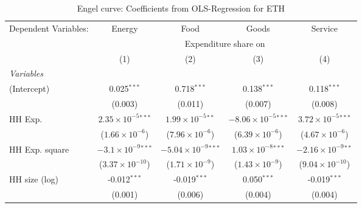 
\begin{table}[htbp!]
   \centering
   \small
   \begin{adjustbox}{width = 1\textwidth, max height = 0.95\textheight, center}
      \begin{threeparttable}[b]
         \caption{\label{tab:Engel_parametric_ETH} Engel curve: Coefficients from OLS-Regression for ETH}
         \begin{tabular}{lcccc}
            \tabularnewline \midrule \midrule
            Dependent Variables: & Energy                        & Food                           & Goods                          & Service\\  
             & \multicolumn{4}{c}{Expenditure share on} \\ 
                                 & (1)                           & (2)                            & (3)                            & (4)\\  
            \midrule
            \emph{Variables}\\
            (Intercept)          & 0.025$^{***}$                 & 0.718$^{***}$                  & 0.138$^{***}$                  & 0.118$^{***}$\\   
                                 & (0.003)                       & (0.011)                        & (0.007)                        & (0.008)\\   
            HH Exp.              & $2.35\times 10^{-5}$$^{***}$  & $1.99\times 10^{-5}$$^{**}$    & $-8.06\times 10^{-5}$$^{***}$  & $3.72\times 10^{-5}$$^{***}$\\    
                                 & ($1.66\times 10^{-6}$)        & ($7.96\times 10^{-6}$)         & ($6.39\times 10^{-6}$)         & ($4.67\times 10^{-6}$)\\    
            HH Exp. square       & $-3.1\times 10^{-9}$$^{***}$  & $-5.04\times 10^{-9}$$^{***}$  & $1.03\times 10^{-8}$$^{***}$   & $-2.16\times 10^{-9}$$^{**}$\\    
                                 & ($3.37\times 10^{-10}$)       & ($1.71\times 10^{-9}$)         & ($1.43\times 10^{-9}$)         & ($9.04\times 10^{-10}$)\\    
            HH size (log)        & -0.012$^{***}$                & -0.019$^{***}$                 & 0.050$^{***}$                  & -0.019$^{***}$\\   
                                 & (0.001)                       & (0.006)                        & (0.004)                        & (0.004)\\   

\end{tabular}
\end{threeparttable}
\end{adjustbox}
\end{table}
